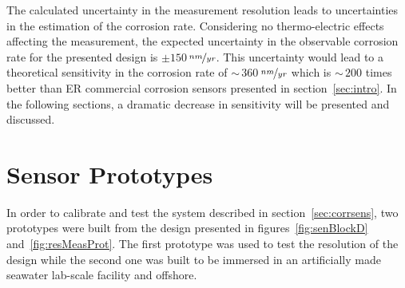 \documentclass[journal,twoside,web]{ieeecolor}
\begin{document}
The calculated uncertainty in the measurement resolution leads to uncertainties in the estimation of the corrosion rate. Considering no thermo-electric effects affecting the measurement, the expected uncertainty in the observable corrosion rate for the presented design is $\pm150$\,$\nicefrac{nm}{yr}$. This uncertainty would lead to a theoretical sensitivity in the corrosion rate of $\sim$\,$360$\,$\nicefrac{nm}{yr}$ which is $\sim$\,$200$ times better than ER commercial corrosion sensors presented in section~\ref{sec:intro}. In the following sections, a dramatic decrease in sensitivity will be presented and discussed. 


\section{Sensor Prototypes}
\label{sec:protytpes}
In order to calibrate and test the system described in section~\ref{sec:corrsens}, two prototypes were built from the design presented in figures~\ref{fig:senBlockD} and~\ref{fig:resMeasProt}. The first prototype was used to test the resolution of the design while the second one was built to be immersed in an artificially made seawater lab-scale facility and offshore.
\end{document}
